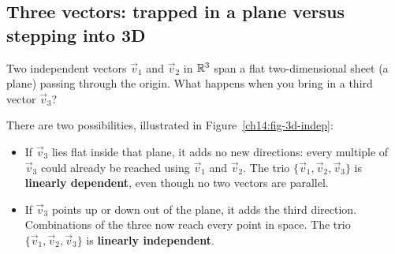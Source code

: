 \subsection*{Three vectors: trapped in a plane versus stepping into 3D}

Two independent vectors $\vec{v}_1$ and $\vec{v}_2$ in $\mathbb{R}^3$ span a flat two-dimensional sheet (a plane) passing through the origin. What happens when you bring in a third vector $\vec{v}_3$?

There are two possibilities, illustrated in Figure~\ref{ch14:fig-3d-indep}:
\begin{itemize}
  \item If $\vec{v}_3$ lies flat inside that plane, it adds no new directions: every multiple of $\vec{v}_3$ could already be reached using $\vec{v}_1$ and $\vec{v}_2$. The trio $\{\vec{v}_1, \vec{v}_2, \vec{v}_3\}$ is \textbf{linearly dependent}, even though no two vectors are parallel.
  \item If $\vec{v}_3$ points up or down out of the plane, it adds the third direction. Combinations of the three now reach every point in space. The trio $\{\vec{v}_1, \vec{v}_2, \vec{v}_3\}$ is \textbf{linearly independent}.
\end{itemize}

